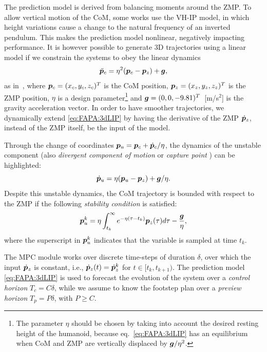 The prediction model is derived from balancing moments around the ZMP. To allow vertical motion of the CoM, some works \cite{CaEdLaMa:18} use the VH-IP model, in which height variations cause a change to the natural frequency of an inverted pendulum. This makes the prediction model nonlinear, negatively impacting performance. It is however possible to generate 3D trajectories using a linear model if we constrain the systems to obey the linear dynamics
\begin{equation}\label{eq:FAPA:3dLIP}
\ddot{{\bm{p}}}_c = \eta^2 ({\bm{p}}_c - {\bm{p}}_z) + {\bm{g}},
\end{equation}
 as in~\cite{Cipriano2023RAS}, where ${\bm{p}}_c = (x_c,y_c,z_c)^T$ is the CoM position, ${\bm{p}}_z = (x_z,y_z,z_z)^T$ is the ZMP position, $\eta$ is a design parameter\footnote{The parameter $\eta$ should be chosen by taking into account the desired resting height of the humanoid, because eq.~\eqref{eq:FAPA:3dLIP} has an equilibrium when CoM and ZMP are vertically displaced by ${\bm{g}}/\eta^2$.} and ${\bm{g}} = (0,0,-9.81)^T$~[m/s$^2$] is the gravity acceleration vector.
In order to have smoother trajectories, we dynamically extend \eqref{eq:FAPA:3dLIP} by having the derivative of the ZMP ${\dot {{\bm{p}}}}_z$, instead of the ZMP itself, be the input of the model.

Through the change of coordinates ${\bm{p}}_u = {\bm{p}}_c + \dot{{\bm{p}}}_c / \eta$, the dynamics of the unstable component (also {\em divergent component of motion} \cite{EnOtAl:15} or {\em capture point} \cite{PrCaDrGo:06}) can be highlighted:
\begin{equation*}
\dot{{\bm{p}}}_u = \eta ({\bm{p}}_u - {\bm{p}}_z) + {\bm{g}}/\eta.
\end{equation*}
Despite this unstable dynamics, the CoM trajectory is bounded with respect to the ZMP if the following {\em stability condition} is satisfied:
\begin{equation}\label{eq:FAPA:stability_condition}
{{\bm{p}}}_u^k = \eta\int_{t_k}^\infty e^{-\eta(\tau-t_k)}{\bm{p}}_z(\tau)d\tau - \frac{{\bm{g}}}{\eta},
\end{equation}
where the superscript in ${{\bm{p}}}_u^k$ indicates that the variable is sampled at time $t_k$.

The MPC module works over discrete time-steps of duration $\delta$, over which the input $\dot {{\bm{p}}}_z$ is constant, i.e., $\dot {{\bm{p}}}_z(t) = \dot {{\bm{p}}}_z^k$ for $t\in[t_k, t_{k+1})$.
The prediction model \eqref{eq:FAPA:3dLIP} is used to forecast the evolution of the system over a \emph{control horizon} $T_c=C\delta$, while we assume to know the footstep plan over a \emph{preview horizon} $T_p=P\delta$, with $P\ge C$.

